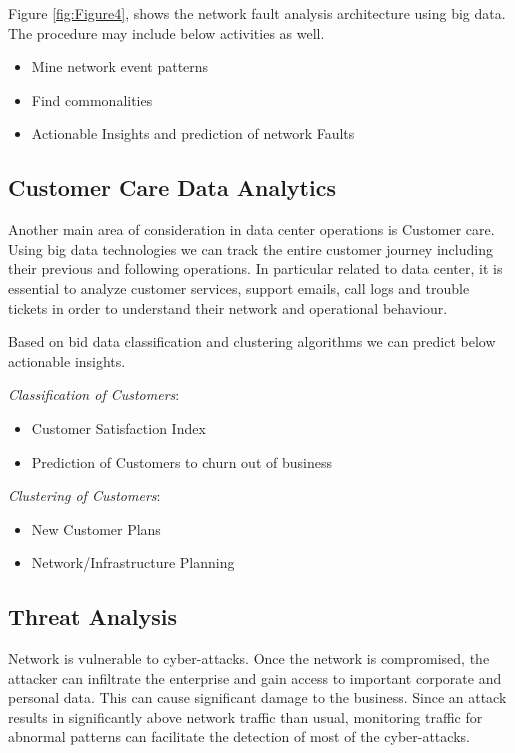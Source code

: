 \documentclass[sigconf]{acmart}
\begin{document}
Figure \ref{fig:Figure4}, shows the network fault analysis architecture using big data. The procedure may include below activities as well.

\begin{itemize}
\item Mine network event patterns
\item Find commonalities
\item Actionable Insights and prediction of network Faults
\end{itemize}

\subsection{Customer Care Data Analytics}

Another main area of consideration in data center operations is Customer care. Using big data technologies we can track the entire customer journey including their previous and following operations. In particular related to data center, it is essential to analyze customer services, support emails, call logs and trouble tickets in order to understand their network and operational behaviour. 

Based on bid data classification and clustering algorithms we can predict below actionable insights.

\textit{Classification of Customers}:


\begin{itemize}
\item Customer Satisfaction Index
\item Prediction of Customers to churn out of business
\end{itemize}

\textit{Clustering of Customers}:

\begin{itemize}
\item New Customer Plans
\item Network/Infrastructure Planning
\end{itemize}

\subsection{Threat Analysis}

Network is vulnerable to cyber-attacks. Once the network is compromised, the attacker can infiltrate the enterprise and gain access to important corporate and personal data. This can cause significant damage to the business. Since an attack results in significantly above network traffic than usual, monitoring traffic for abnormal patterns can facilitate the detection of most of the cyber-attacks.
\end{document}
